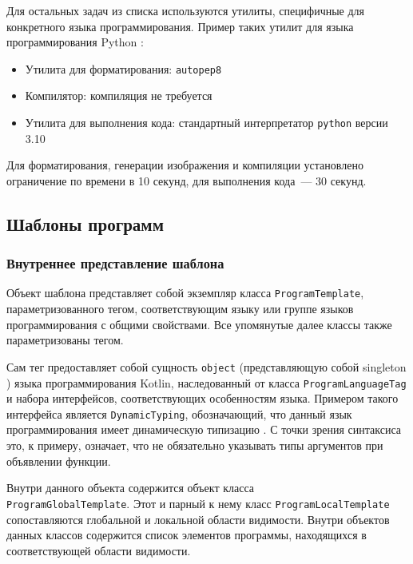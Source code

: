 Для остальных задач из списка используются утилиты, специфичные для конкретного языка программирования.
Пример таких утилит для языка программирования Python \cite{python}:

\begin{itemize}
    \item Утилита для форматирования: \texttt{autopep8} \cite{autopep8}
    \item Компилятор: компиляция не требуется
    \item Утилита для выполнения кода: стандартный интерпретатор \texttt{python} версии 3.10
\end{itemize}

Для форматирования, генерации изображения и компиляции установлено ограничение по времени в 10 секунд,
для выполнения кода~--- 30 секунд.

\subsection{Шаблоны программ}
\subsubsection{Внутреннее представление шаблона} \label{template-classes}
Объект шаблона представляет собой экземпляр класса \texttt{ProgramTemplate},
параметризованного тегом, соответствующим языку или группе языков программирования с
общими свойствами. Все упомянутые далее классы также параметризованы тегом.

Сам тег предоставляет собой сущность \texttt{object} (представляющую собой
singleton \cite{singleton}) языка программирования Kotlin,
наследованный от класса \texttt{ProgramLanguageTag} и набора интерфейсов, соответствующих
особенностям языка. Примером такого интерфейса является \texttt{DynamicTyping},
обозначающий, что данный язык программирования имеет динамическую типизацию
\cite{dynamic-typing}. С точки зрения синтаксиса это, к примеру, означает, что не
обязательно указывать типы аргументов при объявлении функции.

Внутри данного объекта содержится объект класса\\ \texttt{ProgramGlobalTemplate}.
Этот и парный к нему класс \texttt{ProgramLocalTemplate} сопоставляются
глобальной и локальной области видимости. Внутри объектов данных классов
содержится список элементов программы, находящихся в соответствующей области
видимости.

